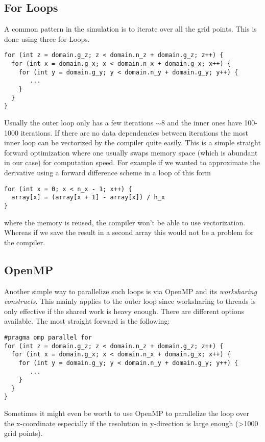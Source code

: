 \documentclass[master.tex]{subfiles}
\begin{document}

\subsection{For Loops}
A common pattern in the simulation is to iterate over all the grid points.
This is done using three for-Loops.
\begin{lstlisting}
for (int z = domain.g_z; z < domain.n_z + domain.g_z; z++) {
  for (int x = domain.g_x; x < domain.n_x + domain.g_x; x++) {
    for (int y = domain.g_y; y < domain.n_y + domain.g_y; y++) {
       ...
    }
  }
}
\end{lstlisting}
Usually the outer loop only has a few iterations $\sim 8$ and the inner ones have 100-1000 iterations.
If there are no data dependencies between iterations the most inner loop can be vectorized by the compiler quite easily. This is a simple straight forward optimization where one usually swaps memory space (which is abundant in our case) for computation speed. For example if we wanted to approximate the derivative using a forward difference scheme in a loop of this form
\begin{lstlisting}
for (int x = 0; x < n_x - 1; x++) {
  array[x] = (array[x + 1] - array[x]) / h_x    
}
\end{lstlisting}
where the memory is reused, the compiler won't be able to use vectorization. Whereas if we save the result in a second array this would not be a problem for the compiler.
\subsection{OpenMP} \label{sec:open-mp-method}
Another simple way to parallelize such loops is via OpenMP and its \textit{worksharing constructs}. This mainly applies to the outer loop since worksharing to threads is only effective if the shared work is heavy enough. There are different options available. The most straight forward is the following:
\begin{lstlisting}
#pragma omp parallel for
for (int z = domain.g_z; z < domain.n_z + domain.g_z; z++) {
  for (int x = domain.g_x; x < domain.n_x + domain.g_x; x++) {
    for (int y = domain.g_y; y < domain.n_y + domain.g_y; y++) {
       ...
    }
  }
}
\end{lstlisting}
\begin{blockquote}
  \small
  Sometimes it might even be worth to use OpenMP to parallelize the loop over the x-coordinate especially if the resolution in y-direction is large enough (\textgreater 1000 grid points).
\end{blockquote}
\end{document}
